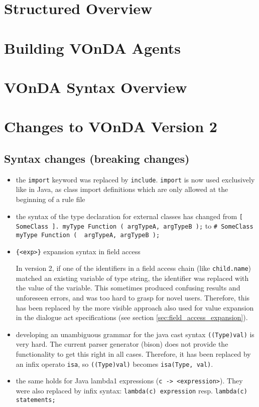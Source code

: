 \documentclass[a4paper]{report}
\newcommand{\vonda}{VOnDA\xspace}
\begin{document}
\chapter{Structured Overview}

\newpage

\newpage

\newpage

\newpage


\chapter{Building \vonda Agents}

\newpage
\chapter{\vonda Syntax Overview}

\chapter{Changes to \vonda Version 2}
\section*{Syntax changes (breaking changes)}
\begin{itemize}
\item the \texttt{import} keyword was replaced by
  \texttt{include}. \texttt{import} is now used exclusively like in
  Java, as class import definitions which are only allowed at the
  beginning of a rule file
\item the syntax of the type declaration for external classes has
  changed from
  \verb|[ SomeClass ]. myType Function ( argTypeA, argTypeB );| to
  \verb|# SomeClass myType Function (  argTypeA, argTypeB );|
\item \verb|{<exp>}| expansion syntax in field access

  In version 2, if one of the identifiers in a field access chain
  (like \texttt{child.name}) matched an existing variable of type
  string, the identifier was replaced with the value of the
  variable. This sometimes produced confusing results and unforeseen
  errors, and was too hard to grasp for novel users. Therefore, this
  has been replaced by the more visible approach also used for value
  expansion in the dialogue act specifications (see section
  \ref{sec:field_access_expansion}).
\item developing an unambiguous grammar for the java cast syntax
  \texttt{((Type)val)} is very hard. The current parser generator
  (bison) does not provide the functionality to get this right in all
  cases. Therefore, it has been replaced by an infix operato
  \texttt{isa}, so \texttt{((Type)val)} becomes \texttt{isa(Type,
    val)}.
\item the same holds for Java lambda1 expressions (\verb|c -> <expression>|). They were also replaced by infix syntax:
  \texttt{lambda(c) expression} resp. \texttt{lambda(c){ statements;
    }}
\end{itemize}
\end{document}
